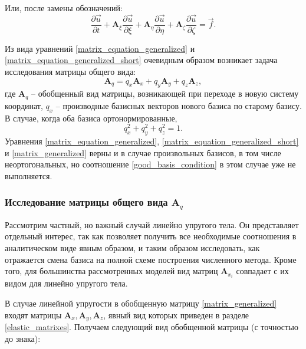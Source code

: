 Или, после замены обозначений:
\begin{equation}
\label{matrix_equation_generalized_short}
\frac{\partial\vec{u}}{\partial{t}} + \mathbf{A}_\xi \frac{\partial\vec{u}}{\partial{\xi}} + 
\mathbf{A}_\eta \frac{\partial\vec{u}}{\partial{\eta}} + \mathbf{A}_\zeta \frac{\partial\vec{u}}{\partial{\zeta}} = \vec f.
\end{equation}

Из вида уравнений \ref{matrix_equation_generalized} и \ref{matrix_equation_generalized_short} очевидным образом возникает задача исследования матрицы общего вида:
\begin{equation}
\label{matrix_generalized}
\mathbf{A}_q = q_x \mathbf{A}_x  + q_y \mathbf{A}_y + q_z \mathbf{A}_z,
\end{equation}
где $\mathbf{A}_q$ -- обобщенный вид матрицы, возникающей при переходе в новую систему координат, $q_x$ -- производные базисных векторов нового базиса по старому базису. В случае, когда оба базиса ортонормированные,
\begin{equation}
\label{good_basis_condition}
q_x^2 + q_y^2 + q_z^2 = 1.
\end{equation}
Уравнения \ref{matrix_equation_generalized}, \ref{matrix_equation_generalized_short} и \ref{matrix_generalized} верны и в случае произвольных базисов, в том числе неортогональных, но соотношение \ref{good_basis_condition} в этом случае уже не выполняется.

\subsubsection{Исследование матрицы общего вида $\mathbf{A}_q$}

Рассмотрим частный, но важный случай линейно упругого тела. Он представляет отдельный интерес, так как позволяет получить все необходимые соотношения в аналитическом виде явным образом, и таким образом исследовать, как отражается смена базиса на полной схеме построения численного метода. Кроме того, для большинства рассмотренных моделей вид матриц $\mathbf A_{x_i}$ совпадает с их видом для линейно упругого тела.

В случае линейной упругости в обобщенную матрицу \ref{matrix_generalized} входят матрицы $\mathbf{A}_x, \mathbf{A}_y, \mathbf{A}_z$, явный вид которых приведен в разделе \ref{elastic_matrixes}. Получаем следующий вид обобщенной матрицы (с точностью до знака):

